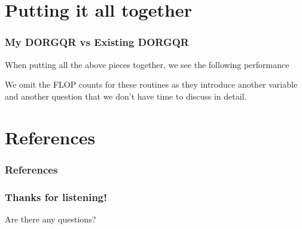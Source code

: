 \documentclass[12pt]{beamer}
\begin{document}
    \section{Putting it all together}
    \begin{frame}
        \frametitle{My DORGQR vs Existing DORGQR} 
        When putting all the above pieces together, we see the following performance

        We omit the FLOP counts for these routines as they introduce another variable and another question that we don't
        have time to discuss in detail. %
    \end{frame}
    \section{References}
    \begin{frame}
        \frametitle{References}
    \end{frame}
    \begin{frame}
        \frametitle{Thanks for listening!}
        Are there any questions?
    \end{frame}
\end{document}
